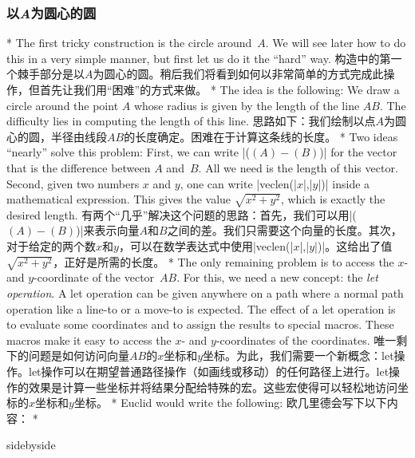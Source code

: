 \begin{paracol}{2}
\subsubsection{以\emph{A}为圆心的圆}
\switchcolumn[0]*%
The first tricky construction is the circle around~$A$. We will see later how
to do this in a very simple manner, but first let us do it the ``hard'' way.
\switchcolumn
构造中的第一个棘手部分是以$A$为圆心的圆。稍后我们将看到如何以非常简单的方式完成此操作，但首先让我们用“困难”的方式来做。
\switchcolumn[0]*%
The idea is the following: We draw a circle around the point $A$ whose radius
is given by the length of the line $AB$. The difficulty lies in computing the
length of this line.
\switchcolumn
思路如下：我们绘制以点$A$为圆心的圆，半径由线段$AB$的长度确定。困难在于计算这条线的长度。
\switchcolumn[0]*%
Two ideas ``nearly'' solve this problem: First, we can write |($ (A) - (B) $)|
for the vector that is the difference between $A$ and~$B$. All we need is the
length of this vector. Second, given two numbers $x$ and $y$, one can write
|veclen(|$x$|,|$y$|)| inside a mathematical expression. This gives the value
$\sqrt{x^2+y^2}$, which is exactly the desired length.
\switchcolumn
有两个“几乎”解决这个问题的思路：首先，我们可以用|($ (A) - (B) $)|来表示向量$A$和$B$之间的差。我们只需要这个向量的长度。其次，对于给定的两个数$x$和$y$，可以在数学表达式中使用|veclen(|$x$|,|$y$|)|。这给出了值$\sqrt{x^2+y^2}$，正好是所需的长度。
\switchcolumn[0]*%
The only remaining problem is to access the $x$- and $y$-coordinate of the
vector~$AB$. For this, we need a new concept: the \emph{let operation}. A let
operation can be given anywhere on a path where a normal path operation like a
line-to or a move-to is expected. The effect of a let operation is to evaluate
some coordinates and to assign the results to special macros. These macros make
it easy to access the $x$- and $y$-coordinates of the coordinates.
\switchcolumn
唯一剩下的问题是如何访问向量$AB$的$x$坐标和$y$坐标。为此，我们需要一个新概念：let操作。let操作可以在期望普通路径操作（如画线或移动）的任何路径上进行。let操作的效果是计算一些坐标并将结果分配给特殊的宏。这些宏使得可以轻松地访问坐标的$x$坐标和$y$坐标。
\switchcolumn[0]*%
Euclid would write the following:
\switchcolumn
欧几里德会写下以下内容：
\switchcolumn[0]*%
\begin{dispExample*}{sidebyside}
\end{dispExample*}
\end{paracol}
